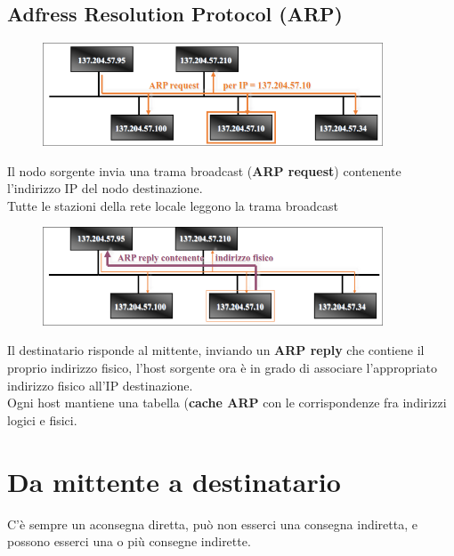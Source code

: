 \documentclass{report}
\begin{document}
                \subsection{Adfress Resolution Protocol (ARP)}
                    \begin{figure}[H]
                        \includegraphics[width=0.9\textwidth]{1/arp.png}
                    \end{figure}
                    Il nodo sorgente invia una trama broadcast (\textbf{ARP request}) contenente l'indirizzo IP del nodo destinazione. 
                    \\
                    Tutte le stazioni della rete locale leggono la trama broadcast
                     \begin{figure}[H]
                        \includegraphics[width=0.9\textwidth]{1/arp2.png}
                    \end{figure}
                    Il destinatario risponde al mittente, inviando un \textbf{ARP reply} che contiene il proprio indirizzo fisico, l'host sorgente ora è in grado di associare l'appropriato indirizzo fisico all'IP destinazione.
                    \\
                    Ogni host mantiene una tabella (\textbf{cache ARP} con le corrispondenze fra indirizzi logici e fisici.
            \section{Da mittente a destinatario} 
                C'è sempre un aconsegna diretta, può non esserci una consegna indiretta, e possono esserci una o più consegne indirette.
\end{document}
